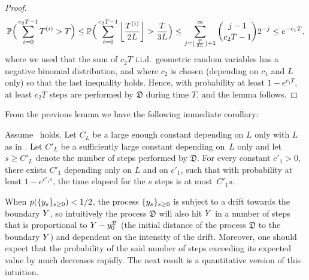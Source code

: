 \begin{proof}
\[\P\Big(\sum_{i=0}^{c_2 T-1}T^{(i)}> T\Big)\leq \P\Big(\sum_{i=0}^{c_2 T-1}\left\lfloor\frac{T^{(i)}}{2L}\right\rfloor> \frac{T}{3L} \Big)\le \sum_{j=\lfloor \frac{T}{3L} \rfloor+1}^\infty \binom{j-1}{c_2 T -1}2^{-j}\leq e^{-c_1 T},\]
where we used that the sum of $c_2 T$ i.i.d.~geometric random variables has a negative binomial distribution, and where $c_2$ is chosen (depending on $c_1$ and $L$ only) so that the last inequality holds.
Hence, with probability at least $1-e^{c_1 T}$, at least $c_2 T$ steps are performed by $\mathfrak{D}$  during time $T$, and the lemma follows.
	\end{proof}
	From the previous lemma we have the following immediate corollary:
	\begin{corollary}\label{cor:geomdomination}
	Assume~ holds. Let $C_L$ be a large enough constant depending on $L$ only with $L$ as in . Let $C'_L$ be a sufficiently large constant depending on~$L$ only and let $s \ge C'_L$ denote the number of steps performed by $\mathfrak{D}$. For every constant $c'_1 > 0$, there exists $C'_1$ depending only on $L$ and on $c'_1$, such that with probability at least $1-e^{c'_1 s}$, the time elapsed for the $s$ steps is at most~$C'_1 s$.
	\end{corollary}
	
When $p(\{\auxy_s\}_{s\geq 0})<1/2$, the process $\{\auxy_s\}_{s\geq 0}$ is subject to a drift towards the boundary $\auxY$, 
so intuitively the process $\mathfrak{D}$ will also hit $\auxY$ in a number of steps 
	that is proportional to $\auxY-\auxy_0^{\mathfrak{D}}$ (the initial distance of the process $\mathfrak{D}$ to the boundary
	$\auxY$) and dependent on the intensity of the drift. Moreover, one should expect that the probability of the said number of steps exceeding its expected value by much decreases rapidly. The next result is a quantitative version of this intuition.
	
